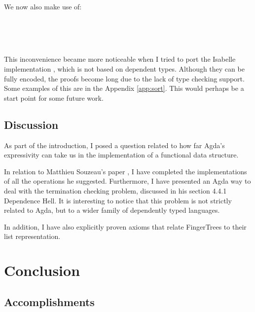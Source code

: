 \documentclass[12pt,twoside,notitlepage]{report}
\begin{document}
We now also make use of: 

\begin{code}
\\
\>[0]\<[2]%
\>[2] \AgdaSymbol{:}    \AgdaSymbol{(}   \AgdaSymbol{)}\<%
\\
\>[0]\<[2]%
\>[2] \AgdaSymbol{:}    \AgdaSymbol{(}   \AgdaSymbol{)}\<%
\\
\end{code}

This inconvenience became more noticeable when I tried to port the Isabelle implementation \cite{isabelle}, which is not based on dependent types. Although they can be fully encoded, the proofs become long due to the lack of type checking support. Some examples of this are in the Appendix \ref{app:sort}. This would perhaps be a start point for some future work.

\section{Discussion}

As part of the introduction, I posed a question related to how far Agda's expressivity can take us in the implementation of a functional data structure.

In relation to Matthieu Souzeau's paper \cite{coq}, I have completed the implementations of all the operations he suggested. Furthermore, I have presented an Agda way to deal with the termination checking problem, discussed in his section 4.4.1 Dependence Hell. 
It is interesting to notice that this problem is not strictly related to Agda, but to a wider family of dependently typed languages.  

In addition, I have also explicitly proven axioms that relate FingerTrees to their list representation.


\chapter{Conclusion}

\section{Accomplishments}
\end{document}
